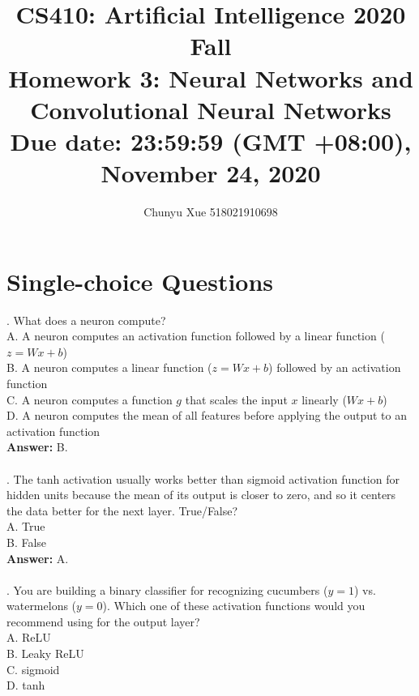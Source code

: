 \documentclass{article}
\title{\normalsize
CS410: Artificial Intelligence 2020 Fall\\
Homework 3: Neural Networks and Convolutional Neural Networks\\
Due date: 23:59:59 (GMT +08:00), November 24, 2020}
\author{Chunyu Xue 518021910698}
\date{}
\begin{document}
 
\maketitle{}

\section{Single-choice Questions}
. What does a neuron compute?\\
    A. A neuron computes an activation function followed by a linear function ($z = Wx + b$)\\
    B. A neuron computes a linear function ($z = Wx + b$) followed by an activation function\\
    C. A neuron computes a function $g$ that scales the input $x$ linearly ($Wx + b$)\\
    D. A neuron computes the mean of all features before applying the output to an activation function\\
    
\textbf{Answer: }B.
~\\
~\\
. The tanh activation usually works better than sigmoid activation function for hidden units because the mean of its output is closer to zero, and so it centers the data better for the next layer. True/False?\\
    A. True \\
    B. False \\
    
\textbf{Answer: }A.
~\\
~\\
. You are building a binary classifier for recognizing cucumbers ($y=1$) vs. watermelons ($y=0$). Which one of these activation functions would you recommend using for the output layer? \\
    A. ReLU \\
    B. Leaky ReLU \\
    C. sigmoid\\
    D. tanh\\
    
\end{document}
